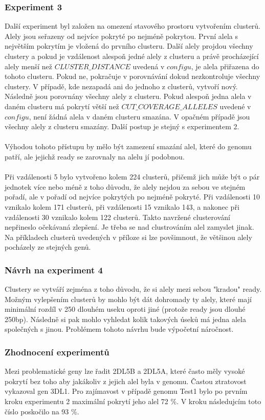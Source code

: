 \documentclass[czech,DP]{thesiskiv}
\numberwithin{equation}{section}
\begin{document}
\subsubsection{Experiment 3}
Další experiment byl založen na omezení stavového prostoru vytvořením clusterů. Alely jsou seřazeny od nejvíce pokryté po nejméně pokrytou. První alela s největším pokrytím je vložená do prvního clusteru. Další alely projdou všechny clustery a pokud je vzdálenost alespoň jedné alely z clusteru a právě procházející alely menší než $CLUSTER\_DISTANCE$ uvedená v $configu$, je alela přiřazena do tohoto clusteru. Pokud ne, pokračuje v porovnávání dokud nezkontroluje všechny clustery. V případě, kde nezapadá ani do jednoho z clusterů, vytvoří nový. Následně jsou porovnány všechny alely z clusteru. Pokud alespoň jedna alela v daném clusteru má pokrytí větší než $CUT\_COVERAGE\_ALLELES$ uvedené v $configu$, není žádná alela v daném clusteru smazána. V opačném případě jsou všechny alely z clusteru smazány. Další postup je stejný s experimentem 2. 
\\
\\
Výhodou tohoto přístupu by mělo být zamezení smazání alel, které do genomu patří, ale jejichž ready se zarovnaly na alelu jí podobnou. 
\\
\\
Při vzdálenosti 5 bylo vytvořeno kolem 224 clusterů, přičemž jich může být o pár jednotek více nebo méně z toho důvodu, že alely nejdou za sebou ve stejném pořadí, ale v pořadí od nejvíce pokrytých po nejméně pokryté. Při vzdálenosti 10 vznikalo kolem 171 clusterů, při vzdálenosti 15 vznikalo 143, a nakonec při vzdálenosti 30 vznikalo kolem 122 clusterů. Takto navržené clusterování nepřineslo očekávaná zlepšení. Je třeba se nad clustrováním alel zamyslet jinak. Na příkladech clusterů uvedených v příloze si lze povšimnout, že většinou alely pocházely ze stejných genů.


\subsubsection{Návrh na experiment 4}
Clustery se vytváří zejména z toho důvodu, že si alely mezi sebou \space "kradou" ready. Možným vylepšením clusterů by mohlo být dát dohromady ty alely, které mají minimální rozdíl v 250 dlouhém useku oproti jiné (protože ready jsou dlouhé 250bp). Následně si pak mohlo vyhledat kolik takových úseků má jedna alela společných s jinou. Problémem tohoto návrhu bude výpočetní náročnost.
 
\subsubsection{Zhodnocení experimentů}
Mezi problematické geny lze řadit 2DL5B a 2DL5A, které často měly vysoké pokrytí bez toho aby jakákoliv z jejich alel byla v genomu. Častou ztratovost vykazoval gen 3DL1. Pro zajímavost v případě genomu Test1 bylo po prvním kroku experimentu 2 maximální pokrytí jeho alel 72 \%. V kroku následujcím toto číslo poskočilo na 93 \%. 
\end{document}
